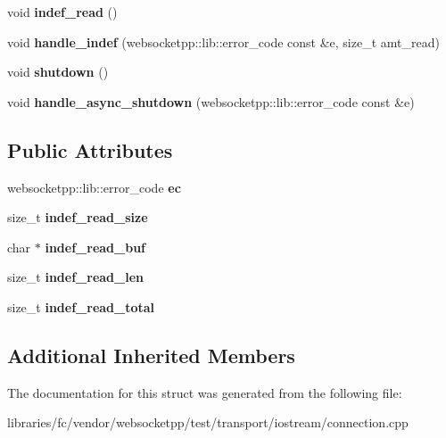 \begin{DoxyCompactItemize}
\mbox{\label{structstub__con_a122900a3be17dcbd6cc693ef8c025358}} 
void {\bfseries indef\+\_\+read} ()
\item 
\mbox{\label{structstub__con_a054f8943e3032fe19b3d9bf48bdf0039}} 
void {\bfseries handle\+\_\+indef} (websocketpp\+::lib\+::error\+\_\+code const \&e, size\+\_\+t amt\+\_\+read)
\item 
\mbox{\label{structstub__con_a206b67c35da3da4fed8bfb2e2e783993}} 
void {\bfseries shutdown} ()
\item 
\mbox{\label{structstub__con_ab1acd168c2d28834e21ff352759f9c66}} 
void {\bfseries handle\+\_\+async\+\_\+shutdown} (websocketpp\+::lib\+::error\+\_\+code const \&e)
\end{DoxyCompactItemize}
\subsection*{Public Attributes}
\begin{DoxyCompactItemize}
\item 
\mbox{\label{structstub__con_a9e791dd7df34a3c59adb1255bf8ad531}} 
websocketpp\+::lib\+::error\+\_\+code {\bfseries ec}
\item 
\mbox{\label{structstub__con_a7874b39f63070e3f8d638ec08833fa32}} 
size\+\_\+t {\bfseries indef\+\_\+read\+\_\+size}
\item 
\mbox{\label{structstub__con_a7c30a1651bfeda92ba5798f37fbab4e0}} 
char $\ast$ {\bfseries indef\+\_\+read\+\_\+buf}
\item 
\mbox{\label{structstub__con_a259aa44e4b056988d48838539a134db9}} 
size\+\_\+t {\bfseries indef\+\_\+read\+\_\+len}
\item 
\mbox{\label{structstub__con_adc048dddd9b964b03e937c69fbce1c8e}} 
size\+\_\+t {\bfseries indef\+\_\+read\+\_\+total}
\end{DoxyCompactItemize}
\subsection*{Additional Inherited Members}


The documentation for this struct was generated from the following file\+:\begin{DoxyCompactItemize}
\item 
libraries/fc/vendor/websocketpp/test/transport/iostream/connection.\+cpp\end{DoxyCompactItemize}
